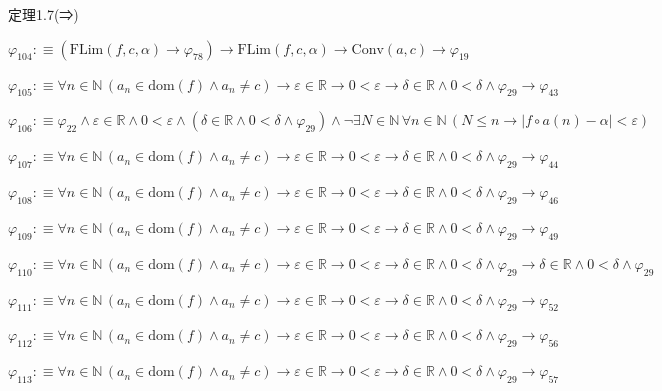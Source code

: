 \begin{fullproof}{定理1.7(⇒)}
\begin{abbrevlist}
\item $\varphi_{104} :\equiv (\mathrm{FLim}(f,c,\alpha) \to \varphi_{78}) \to \mathrm{FLim}(f,c,\alpha) \to \mathrm{Conv}(a,c) \to \varphi_{19}$
\item $\varphi_{105} :\equiv \forall n \in \mathbb{N}\,(a_{n} \in \mathrm{dom}(f) \land a_{n} \neq c) \to \varepsilon \in \mathbb{R} \to 0 < \varepsilon \to \delta \in \mathbb{R} \land 0 < \delta \land \varphi_{29} \to \varphi_{43}$
\item $\varphi_{106} :\equiv \varphi_{22} \land \varepsilon \in \mathbb{R} \land 0 < \varepsilon \land (\delta \in \mathbb{R} \land 0 < \delta \land \varphi_{29}) \land \neg \exists N \in \mathbb{N}\,\forall n \in \mathbb{N}\,(N \leq n \to \lvert f \circ a(n) - \alpha \rvert < \varepsilon)$
\item $\varphi_{107} :\equiv \forall n \in \mathbb{N}\,(a_{n} \in \mathrm{dom}(f) \land a_{n} \neq c) \to \varepsilon \in \mathbb{R} \to 0 < \varepsilon \to \delta \in \mathbb{R} \land 0 < \delta \land \varphi_{29} \to \varphi_{44}$
\item $\varphi_{108} :\equiv \forall n \in \mathbb{N}\,(a_{n} \in \mathrm{dom}(f) \land a_{n} \neq c) \to \varepsilon \in \mathbb{R} \to 0 < \varepsilon \to \delta \in \mathbb{R} \land 0 < \delta \land \varphi_{29} \to \varphi_{46}$
\item $\varphi_{109} :\equiv \forall n \in \mathbb{N}\,(a_{n} \in \mathrm{dom}(f) \land a_{n} \neq c) \to \varepsilon \in \mathbb{R} \to 0 < \varepsilon \to \delta \in \mathbb{R} \land 0 < \delta \land \varphi_{29} \to \varphi_{49}$
\item $\varphi_{110} :\equiv \forall n \in \mathbb{N}\,(a_{n} \in \mathrm{dom}(f) \land a_{n} \neq c) \to \varepsilon \in \mathbb{R} \to 0 < \varepsilon \to \delta \in \mathbb{R} \land 0 < \delta \land \varphi_{29} \to \delta \in \mathbb{R} \land 0 < \delta \land \varphi_{29}$
\item $\varphi_{111} :\equiv \forall n \in \mathbb{N}\,(a_{n} \in \mathrm{dom}(f) \land a_{n} \neq c) \to \varepsilon \in \mathbb{R} \to 0 < \varepsilon \to \delta \in \mathbb{R} \land 0 < \delta \land \varphi_{29} \to \varphi_{52}$
\item $\varphi_{112} :\equiv \forall n \in \mathbb{N}\,(a_{n} \in \mathrm{dom}(f) \land a_{n} \neq c) \to \varepsilon \in \mathbb{R} \to 0 < \varepsilon \to \delta \in \mathbb{R} \land 0 < \delta \land \varphi_{29} \to \varphi_{56}$
\item $\varphi_{113} :\equiv \forall n \in \mathbb{N}\,(a_{n} \in \mathrm{dom}(f) \land a_{n} \neq c) \to \varepsilon \in \mathbb{R} \to 0 < \varepsilon \to \delta \in \mathbb{R} \land 0 < \delta \land \varphi_{29} \to \varphi_{57}$

\end{abbrevlist}
\end{fullproof}
